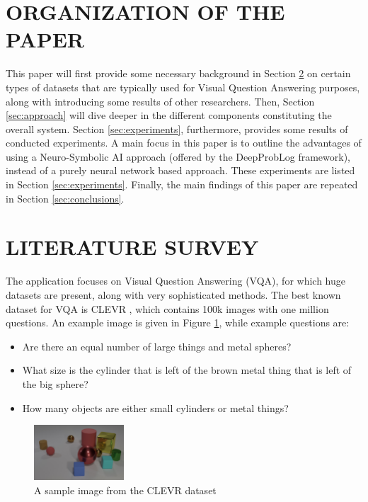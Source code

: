 \documentclass[english]{sobraep}
\begin{document}
\section{ORGANIZATION OF THE PAPER}
This paper will first provide some necessary background in Section \ref{sec:literature_survey} on certain types of datasets that are typically used for Visual Question Answering purposes, along with introducing some results of other researchers. Then, Section \ref{sec:approach} will dive deeper in the different components constituting the overall system. Section \ref{sec:experiments}, furthermore, provides some results of conducted experiments. A main focus in this paper is to outline the advantages of using a Neuro-Symbolic AI approach (offered by the DeepProbLog framework), instead of a purely neural network based approach. These experiments are listed in Section \ref{sec:experiments}. Finally, the main findings of this paper are repeated in Section \ref{sec:conclusions}.

\section{LITERATURE SURVEY}
\label{sec:literature_survey}
The application focuses on Visual Question Answering (VQA), for which huge datasets are present, along with very sophisticated methods. The best known dataset for VQA is CLEVR \cite{clevr_dataset}, which contains 100k images with one million questions. An example image is given in Figure \ref{fig:sample_image_clevr}, while example questions are:
\begin{itemize}
    \item Are there an equal number of large things and metal spheres?
    \item What size is the cylinder that is left of the brown metal thing that is left of the big sphere?
    \item How many objects are either small cylinders or metal things?
\end{itemize}

\begin{figure}[htp]
    \begin{center}
    \includegraphics[width=0.3\textwidth]{clevr.jpg}
    \captionsetup{justification=centering}
    \caption{A sample image from the CLEVR dataset \cite{clevr_dataset}}
    \label{fig:sample_image_clevr}
    \end{center}
\end{figure}
\end{document}
